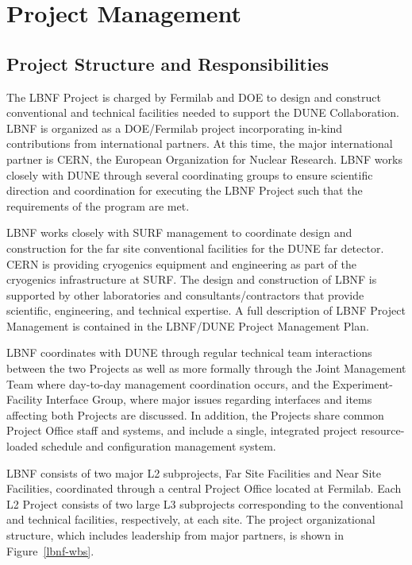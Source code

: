 \chapter{Project Management}
\label{ch:intro-pm}

\section{Project Structure and Responsibilities}

The LBNF Project is charged by Fermilab and DOE to design and construct conventional and technical facilities needed to support the DUNE Collaboration. LBNF is organized as a DOE/Fermilab project incorporating in-kind contributions from international partners. At this time, the major international partner is CERN, the European Organization for Nuclear Research. LBNF works closely with DUNE through several coordinating groups to ensure scientific direction and coordination for executing the LBNF Project such that the requirements of the program are met. 

LBNF works closely with SURF management to coordinate design and construction for the far site conventional facilities for the DUNE far detector. CERN is providing cryogenics equipment and engineering as part of the cryogenics infrastructure at SURF. The design and construction of LBNF is supported by other laboratories and consultants/contractors that provide scientific, engineering, and technical expertise.  A full description of LBNF Project Management is contained in the LBNF/DUNE Project Management Plan\cite{PMP-10770}.

LBNF coordinates with DUNE through regular technical team interactions between the two Projects as well as more formally through the Joint Management Team where day-to-day management coordination occurs, and the Experiment-Facility Interface Group, where major issues regarding interfaces and items affecting both Projects are discussed. In addition, the Projects share common Project Office staff and systems, and include a single, integrated project resource-loaded schedule and configuration management system. 


LBNF consists of two major L2 subprojects, Far Site Facilities and Near Site Facilities, coordinated through a central Project Office located at Fermilab.  Each L2 Project consists of two large L3 subprojects corresponding to the conventional and technical facilities, respectively, at each site. The project organizational structure, which includes leadership from major partners, is shown in Figure~\ref{lbnf-wbs}.


